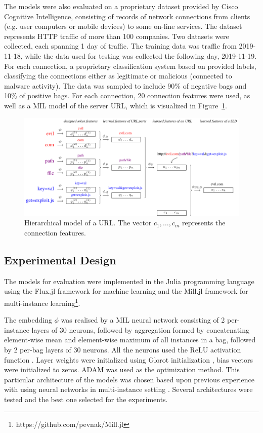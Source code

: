 The models were also evaluated on a proprietary dataset provided by Cisco Cognitive Intelligence, consisting of records of network connections from clients (e.g. user computers or mobile devices) to some on-line services. The dataset represents HTTP traffic of more than 100 companies. Two datasets were collected, each spanning 1 day of traffic. The training data was traffic from 2019-11-18, while the data used for testing was collected the following day, 2019-11-19. For each connection, a proprietary classification system based on \cite{jusko_graph-based_2017} provided labels, classifying the connections either as legitimate or malicious (connected to malware activity). The data was sampled to include 90\% of negative bags and 10\% of positive bags. For each connection, 20 connection features were used, as well as a MIL model of the server URL, which is visualized in Figure~\ref{fig:URL-model}.

\begin{figure}
  \centering
  \includegraphics[width=\textwidth]{images/URL-model/URL-model.pdf}
  \caption{Hierarchical model of a URL. The vector \( c_1, \dots, c_m \) represents the connection features.}\label{fig:URL-model}
\end{figure}

\subsection{Experimental Design}

The models for evaluation were implemented in the Julia programming language \cite{bezanson_julia:_2017} using the Flux.jl framework for machine learning \cite{innes_flux:_2018} and the Mill.jl framework for multi-instance learning\footnote{https://github.com/pevnak/Mill.jl}.

The embedding \( \phi \) was realised by a MIL neural network consisting of 2 per-instance layers of 30 neurons, followed by aggregation formed by concatenating element-wise mean and element-wise maximum of all instances in a bag, followed by 2 per-bag layers of 30 neurons. All the neurons used the ReLU activation function \cite{hahnloser_digital_2000}. Layer weights were initialized using Glorot initialization \cite{glorot_understanding_2010}, bias vectors were initialized to zeros. ADAM \cite{kingma_adam:_2014} was used as the optimization method. This particular architecture of the models was chosen based upon previous experience with using neural networks in multi-instance setting \cite{pevny_nested_2020}. Several architectures were tested and the best one selected for the experiments.

